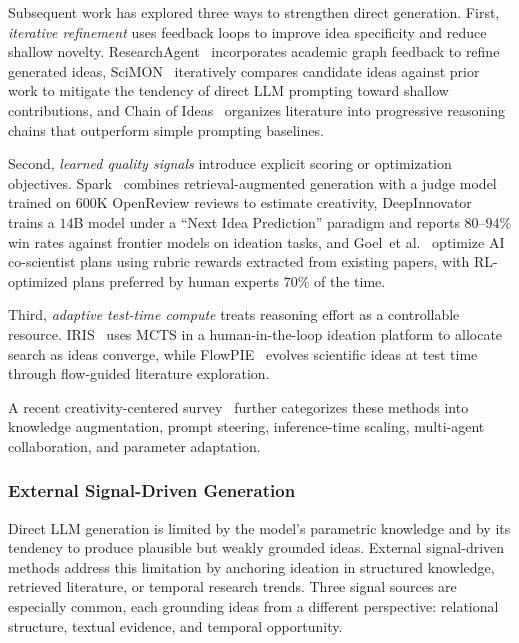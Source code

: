\documentclass{llmxive}
\providecommand{\etal}{et al.\xspace}
\begin{document}
Subsequent work has explored three ways to strengthen direct generation. First, \emph{iterative refinement} uses feedback loops to improve idea specificity and reduce shallow novelty. ResearchAgent~\cite{baek2024researchagent} incorporates academic graph feedback to refine generated ideas, SciMON~\cite{wang2024scimon} iteratively compares candidate ideas against prior work to mitigate the tendency of direct LLM prompting toward shallow contributions, and Chain of Ideas~\cite{li2024chainofideas} organizes literature into progressive reasoning chains that outperform simple prompting baselines. 

Second, \emph{learned quality signals} introduce explicit scoring or optimization objectives. Spark~\cite{sanyal2025spark} combines retrieval-augmented generation with a judge model trained on $600$K OpenReview reviews to estimate creativity, DeepInnovator~\cite{deepinnovator2026} trains a $14$B model under a ``Next Idea Prediction'' paradigm and reports $80$--$94\%$ win rates against frontier models on ideation tasks, and Goel~\etal~\cite{rubricrewards2025} optimize AI co-scientist plans using rubric rewards extracted from existing papers, with RL-optimized plans preferred by human experts $70\%$ of the time. 

Third, \emph{adaptive test-time compute} treats reasoning effort as a controllable resource. IRIS~\cite{iris2025} uses MCTS in a human-in-the-loop ideation platform to allocate search as ideas converge, while FlowPIE~\cite{flowpie2026} evolves scientific ideas at test time through flow-guided literature exploration. 

A recent creativity-centered survey~\cite{shahhosseini2025ideationsurvey} further categorizes these methods into knowledge augmentation, prompt steering, inference-time scaling, multi-agent collaboration, and parameter adaptation.



\subsubsection{External Signal-Driven Generation}
\label{sec:idea_external}

Direct LLM generation is limited by the model's parametric knowledge and by its tendency to produce plausible but weakly grounded ideas. External signal-driven methods address this limitation by anchoring ideation in structured knowledge, retrieved literature, or temporal research trends. Three signal sources are especially common, each grounding ideas from a different perspective: relational structure, textual evidence, and temporal opportunity.
\end{document}
